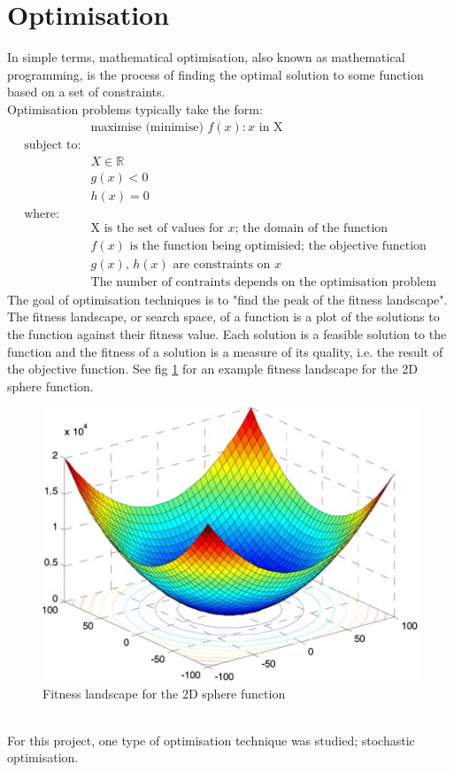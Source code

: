 \section{Optimisation}
In simple terms, mathematical optimisation, also known as mathematical programming, is the process of finding the optimal solution to some function based on a set of constraints.
\\Optimisation problems typically take the form\cite{mathprog}:
\begin{equation}
  \begin{split}
    &\text{maximise (minimise) } f(x) : x \text{ in X}
    \\\text{subject to:}
    \\&X \in \mathbb{R}
    \\&g(x) < 0
    \\&h(x) = 0
    \\\text{where:}
    \\&\text{X is the set of values for } x \text{; the domain of the function}
    \\&f(x) \text{ is the function being optimisied; the objective function}
    \\&g(x) \text{, } h(x) \text{ are constraints on } x 
    \\&\text{The number of contraints depends on the optimisation problem}
  \end{split}
\label{eq:optimisation}
\end{equation}
The goal of optimisation techniques is to "find the peak of the fitness landscape"\cite{stoch}. The fitness landscape, or search space, of a function is a plot of the solutions to the function against their fitness value. Each solution is a feasible solution to the function and the fitness of a solution is a measure of its quality, i.e. the result of the objective function. See fig \ref{fig:fitness landscape}\cite{fitland} for an example fitness landscape for the 2D sphere function.
\begin{figure}[tp]
   \begin{center}
     \includegraphics{Figures/sphere_function}
   \end{center}
   \caption{Fitness landscape for the 2D sphere function}
   \label{fig:fitness landscape}
\end{figure}
\\For this project, one type of optimisation technique was studied; stochastic optimisation. 

